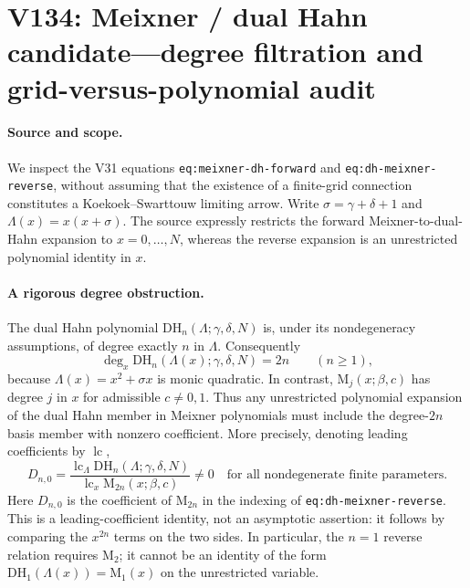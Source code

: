 \documentclass[11pt]{article}
\begin{document}
\clearpage
\section{V134: Meixner / dual Hahn candidate---degree filtration and grid-versus-polynomial audit}
\label{sec:v134-meixner-dual-hahn}
\paragraph{Source and scope.}
We inspect the V31 equations \texttt{eq:meixner-dh-forward} and
\texttt{eq:dh-meixner-reverse}, without assuming that the existence of a
finite-grid connection constitutes a Koekoek--Swarttouw limiting arrow.
Write $\sigma=\gamma+\delta+1$ and
$\Lambda(x)=x(x+\sigma)$.  The source expressly restricts the forward
Meixner-to-dual-Hahn expansion to $x=0,\ldots,N$, whereas the reverse
expansion is an unrestricted polynomial identity in $x$.

\paragraph{A rigorous degree obstruction.}
The dual Hahn polynomial $\mathrm{DH}_n(\Lambda;\gamma,\delta,N)$ is,
under its nondegeneracy assumptions, of degree exactly $n$ in $\Lambda$.
Consequently
\begin{equation}\label{eq:v134-degree}
 \deg_x\mathrm{DH}_n(\Lambda(x);\gamma,\delta,N)=2n
 \qquad(n\ge1),
\end{equation}
because $\Lambda(x)=x^2+\sigma x$ is monic quadratic.  In contrast,
$\mathrm M_j(x;\beta,c)$ has degree $j$ in $x$ for admissible $c\ne0,1$.
Thus any unrestricted polynomial expansion of the dual Hahn member in
Meixner polynomials must include the degree-$2n$ basis member with
nonzero coefficient.  More precisely, denoting leading coefficients by
$\operatorname{lc}$,
\begin{equation}\label{eq:v134-top}
 D_{n,0}=
 \frac{\operatorname{lc}_{\Lambda}\mathrm{DH}_n(\Lambda;\gamma,\delta,N)}
 {\operatorname{lc}_{x}\mathrm M_{2n}(x;\beta,c)}\ne0
 \quad\text{for all nondegenerate finite parameters}.
\end{equation}
Here $D_{n,0}$ is the coefficient of $\mathrm M_{2n}$ in the indexing
of \texttt{eq:dh-meixner-reverse}.  This is a leading-coefficient identity,
not an asymptotic assertion: it follows by comparing the $x^{2n}$ terms
on the two sides.  In particular, the $n=1$ reverse relation requires
$\mathrm M_2$; it cannot be an identity of the form
$\mathrm{DH}_1(\Lambda(x))=\mathrm M_1(x)$ on the unrestricted variable.
\end{document}

